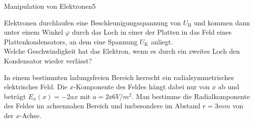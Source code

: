 \begin{problem}{Manipulation von Elektronen}{5}
\begin{abcenum}
\item Elektronen durchlaufen eine Beschleunigungsspannung von $U_\mathrm{B}$ und kommen dann
unter einem Winkel $\varphi$ durch das Loch in einer der Platten in das Feld eines Plattenkondensators,
an dem eine Spannung $U_\mathrm{K}$ anliegt.\\
Welche Geschwindigkeit hat das Elektron, wenn es durch ein zweites Loch den Kondensator wieder verlässt?
\item In einem bestimmten ladungsfreien Bereich herrscht ein radialsymmetrisches elektrisches Feld. Die $x$-Komponente des Feldes hängt dabei nur von $x$ ab und beträgt $E_x(x) = -2 a x$ mit $a=2\ee{6}\unit{V/m^2}$. Man bestimme die Radialkomponente des Feldes im achsennahen Bereich und insbesondere im Abstand $r=3\unit{mm}$ von der $x$-Achse.
\end{abcenum}


\end{problem}
